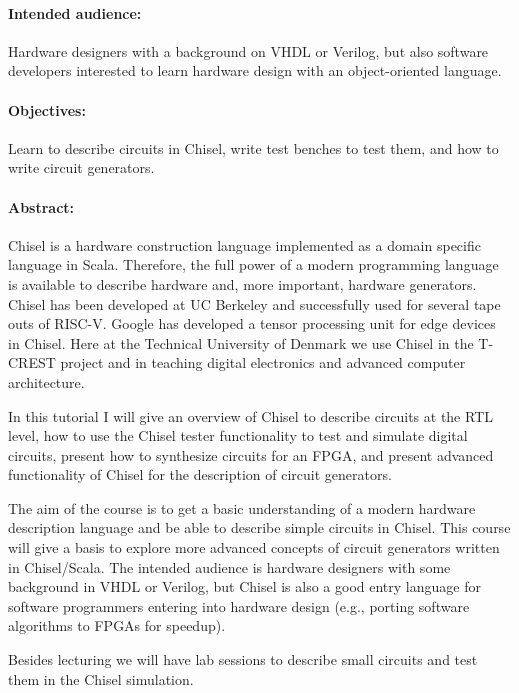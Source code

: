 \documentclass{article}
\begin{document}
\paragraph{Intended audience:}

Hardware designers with a background on VHDL or Verilog, but also software developers
interested to learn hardware design with an object-oriented language.
 
\paragraph{Objectives:}

Learn to describe circuits in Chisel, write test benches to test them, and how to write
circuit generators.

\paragraph{Abstract:}

Chisel is a hardware construction language implemented as a domain specific language in Scala. Therefore, the full power of a modern programming language is available to describe hardware and, more important, hardware generators. Chisel has been developed at UC Berkeley and successfully used for several tape outs of RISC-V. Google has developed a tensor processing unit for edge devices in Chisel. Here at the Technical University of Denmark we use Chisel in the T-CREST project and in teaching digital electronics and advanced computer architecture.

In this tutorial I will give an overview of Chisel to describe circuits at the RTL level, how to use the Chisel tester functionality to test and simulate digital circuits, present how to synthesize circuits for an FPGA, and present advanced functionality of Chisel for the description of circuit generators.

The aim of the course is to get a basic understanding of a modern hardware description language and be able to describe simple circuits in Chisel. This course will give a basis to explore more advanced concepts of circuit generators written in Chisel/Scala. The intended audience is hardware designers with some background in VHDL or Verilog, but Chisel is also a good entry language for software programmers entering into hardware design
(e.g., porting software algorithms to FPGAs for speedup).

Besides lecturing we will have lab sessions to describe small circuits and test them in the Chisel simulation.
\end{document}
